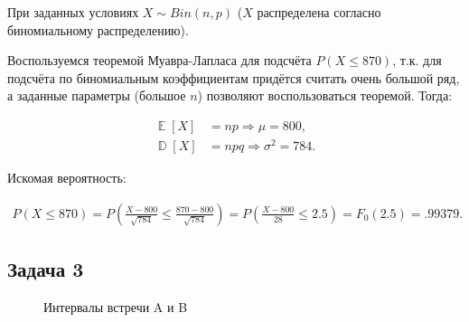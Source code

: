 \documentclass[a4paper,11pt]{article}
\DeclareMathOperator*{\D}{\mathbb{D}}   %
\DeclareMathOperator*{\E}{\mathbb{E}}   %
\begin{document}
При заданных условиях $X \sim Bin(n, p)$ ($X$ распределена согласно биномиальному распределению).

Воспользуемся теоремой Муавра-Лапласа для подсчёта $P(X \leq 870)$, т.к. для подсчёта по биномиальным коэффициентам придётся считать очень большой ряд, а заданные параметры (большое $n$) позволяют воспользоваться теоремой. Тогда:

\begin{align*}
\E[X] & = np \Rightarrow \mu = 800, \\
\D[X] & = npq \Rightarrow \sigma^2 = 784.
\end{align*}

Искомая вероятность:

\begin{align*}
P(X \leq 870) = P(\frac{X - 800}{\sqrt{784}} \leq \frac{870 - 800}{\sqrt{784}})
= P(\frac{X - 800}{28} \leq 2.5) = F_0(2.5) = .99379.
\end{align*}

\subsection{Задача 3}

\begin{wrapfigure}{r}{0.5\textwidth}
  \begin{center}
  \end{center}
  \caption{Интервалы встречи A и B}
  \label{fig:task3}
\end{wrapfigure}
\end{document}
